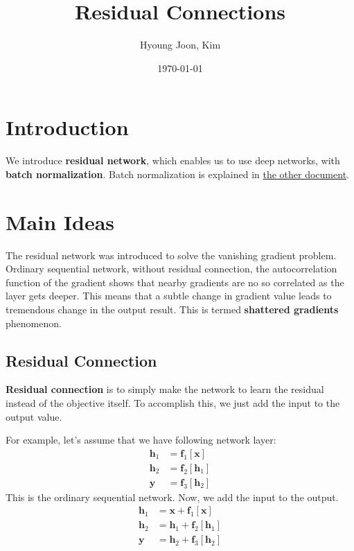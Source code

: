 \documentclass{article}
\title{Residual Connections}
\author{Hyoung Joon, Kim}
\date{\today}
\begin{document}
\maketitle
\tableofcontents
\newpage

\section{Introduction}
    We introduce \textbf{residual network}, which enables us to use deep networks, with \textbf{batch normalization}.
    Batch normalization is explained in \href{run:../../_common/normalization/normalization.pdf}{the other document}.

\section{Main Ideas}
    The residual network was introduced to solve the vanishing gradient problem. Ordinary sequential network,
    without residual connection, the autocorrelation function of the gradient shows that nearby gradients are
    no so correlated as the layer gets deeper. This means that a subtle change in gradient value leads to tremendous
    change in the output result. This is termed \textbf{shattered gradients} phenomenon.

    \subsection{Residual Connection}
        \textbf{Residual connection} is to simply make the network to learn the residual instead of the objective itself.
        To accomplish this, we just add the input to the output value.

        For example, let's assume that we have following network layer:
        \begin{align}
            \textbf{h}_1 &= \textbf{f}_1[\textbf{x}] \\
            \textbf{h}_2 &= \textbf{f}_2[\textbf{h}_1] \\
            \textbf{y} &= \textbf{f}_3[\textbf{h}_2]
        \end{align}
        This is the ordinary sequential network.
        Now, we add the input to the output.
        \begin{align}
            \textbf{h}_1 &= \textbf{x} + \textbf{f}_1[\textbf{x}] \\
            \textbf{h}_2 &= \textbf{h}_1 + \textbf{f}_2[\textbf{h}_1] \\
            \textbf{y} &= \textbf{h}_2 + \textbf{f}_3[\textbf{h}_2]
        \end{align}
        
\end{document}
